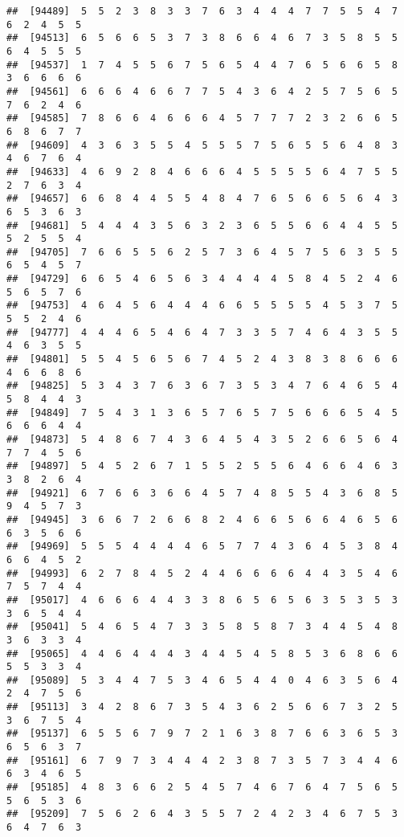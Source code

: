 \documentclass[
]{book}
\begin{document}
\begin{verbatim}
##  [94489]  5  5  2  3  8  3  3  7  6  3  4  4  4  7  7  5  5  4  7  6  2  4  5  5
##  [94513]  6  5  6  6  5  3  7  3  8  6  6  4  6  7  3  5  8  5  5  6  4  5  5  5
##  [94537]  1  7  4  5  5  6  7  5  6  5  4  4  7  6  5  6  6  5  8  3  6  6  6  6
##  [94561]  6  6  6  4  6  6  7  7  5  4  3  6  4  2  5  7  5  6  5  7  6  2  4  6
##  [94585]  7  8  6  6  4  6  6  6  4  5  7  7  7  2  3  2  6  6  5  6  8  6  7  7
##  [94609]  4  3  6  3  5  5  4  5  5  5  7  5  6  5  5  6  4  8  3  4  6  7  6  4
##  [94633]  4  6  9  2  8  4  6  6  6  4  5  5  5  5  6  4  7  5  5  2  7  6  3  4
##  [94657]  6  6  8  4  4  5  5  4  8  4  7  6  5  6  6  5  6  4  3  6  5  3  6  3
##  [94681]  5  4  4  4  3  5  6  3  2  3  6  5  5  6  6  4  4  5  5  5  2  5  5  4
##  [94705]  7  6  6  5  5  6  2  5  7  3  6  4  5  7  5  6  3  5  5  6  5  4  5  7
##  [94729]  6  6  5  4  6  5  6  3  4  4  4  4  5  8  4  5  2  4  6  5  6  5  7  6
##  [94753]  4  6  4  5  6  4  4  4  6  6  5  5  5  5  4  5  3  7  5  5  5  2  4  6
##  [94777]  4  4  4  6  5  4  6  4  7  3  3  5  7  4  6  4  3  5  5  4  6  3  5  5
##  [94801]  5  5  4  5  6  5  6  7  4  5  2  4  3  8  3  8  6  6  6  4  6  6  8  6
##  [94825]  5  3  4  3  7  6  3  6  7  3  5  3  4  7  6  4  6  5  4  5  8  4  4  3
##  [94849]  7  5  4  3  1  3  6  5  7  6  5  7  5  6  6  6  5  4  5  6  6  6  4  4
##  [94873]  5  4  8  6  7  4  3  6  4  5  4  3  5  2  6  6  5  6  4  7  7  4  5  6
##  [94897]  5  4  5  2  6  7  1  5  5  2  5  5  6  4  6  6  4  6  3  3  8  2  6  4
##  [94921]  6  7  6  6  3  6  6  4  5  7  4  8  5  5  4  3  6  8  5  9  4  5  7  3
##  [94945]  3  6  6  7  2  6  6  8  2  4  6  6  5  6  6  4  6  5  6  6  3  5  6  6
##  [94969]  5  5  5  4  4  4  4  6  5  7  7  4  3  6  4  5  3  8  4  6  6  4  5  2
##  [94993]  6  2  7  8  4  5  2  4  4  6  6  6  6  4  4  3  5  4  6  7  5  7  4  4
##  [95017]  4  6  6  6  4  4  3  3  8  6  5  6  5  6  3  5  3  5  3  3  6  5  4  4
##  [95041]  5  4  6  5  4  7  3  3  5  8  5  8  7  3  4  4  5  4  8  3  6  3  3  4
##  [95065]  4  4  6  4  4  4  3  4  4  5  4  5  8  5  3  6  8  6  6  5  5  3  3  4
##  [95089]  5  3  4  4  7  5  3  4  6  5  4  4  0  4  6  3  5  6  4  2  4  7  5  6
##  [95113]  3  4  2  8  6  7  3  5  4  3  6  2  5  6  6  7  3  2  5  3  6  7  5  4
##  [95137]  6  5  5  6  7  9  7  2  1  6  3  8  7  6  6  3  6  5  3  6  5  6  3  7
##  [95161]  6  7  9  7  3  4  4  4  2  3  8  7  3  5  7  3  4  4  6  6  3  4  6  5
##  [95185]  4  8  3  6  6  2  5  4  5  7  4  6  7  6  4  7  5  6  5  5  6  5  3  6
##  [95209]  7  5  6  2  6  4  3  5  5  7  2  4  2  3  4  6  7  5  3  6  4  7  6  3

\end{verbatim}
\end{document}
